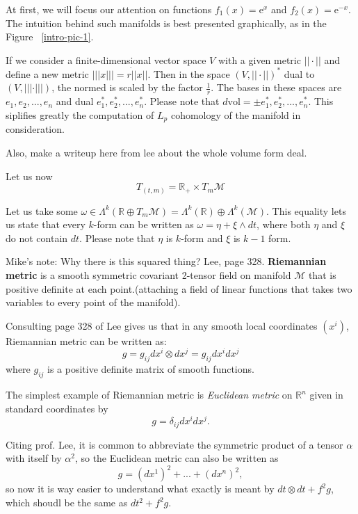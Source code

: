 \documentclass[licencjacka]{pracamgr}
\begin{document}

At first, we will focus our attention on functions $f_1(x) = \mathrm{e}^{x}$ and
$f_2(x) = \mathrm{e}^{-x}$. The intuition behind such manifolds is best presented
graphically, as in the Figure ~\ref{intro-pic-1}.

If we consider a finite-dimensional vector space $V$ with a given metric $||
\cdot ||$ and define a new metric $||| x |||  = r \dot || x ||$. Then in the
space $(V, || \cdot||)^\ast$ dual to $(V, ||| \cdot |||)$, the normed is scaled
by the factor $\frac{1}{r}$. The bases in these spaces are $e_1, e_2, ..., e_n$ and dual
$e_1^\ast, e_2^\ast, ..., e_n^\ast$. Please note that $d\mathrm{vol} = \pm
e_1^\ast, e_2^\ast, ..., e_n^\ast $. This siplifies greatly the computation of
$L_p$ cohomology of the manifold in consideration.

Also, make a writeup here from lee about the whole volume form deal.


Let us now
\[
    T_{(t, m)} = \mathbb{R}_+ \times T_m \mathcal{M}
\]

Let us take some $ \omega \in \Lambda^k(\mathbb{R} \oplus T_m \mathcal{M}) = 
\Lambda^k(\mathbb{R})  \oplus \Lambda^k(\mathcal{M}) $.
This equality lets us state that every $k$-form can be written as $\omega = \eta
+ \xi \wedge dt$, where both $\eta$ and $\xi$ do not contain $dt$.  Please note
that $\eta$ is $k$-form and $\xi$ is $k-1$ form. \\

\scriptsize

    Mike's note: Why there is this squared thing?
    Lee, page 328.
    \textbf{Riemannian metric} is a smooth symmetric covariant 2-tensor field
    on manifold $\mathcal{M}$ that is positive definite at each point.(attaching
    a field of linear functions that takes two variables to every point of the
    manifold).

    Consulting page 328 of Lee gives us that in any smooth local coordinates
    $(x^i)$, Riemannian metric can be written as:
    \[
        g = g_{ij} dx^i \otimes dx^j = g_{ij} dx^i dx^j
    \]
    where $g_{ij}$ is a positive definite matrix of smooth functions. 

    The simplest example of Riemannian metric is \emph{Euclidean metric} on
    $\mathbb{R}^n$ given in standard coordinates by 
    \[
        g = \delta_{ij}dx^idx^j.
    \]

    Citing prof. Lee, it is common to abbreviate the symmetric product of a tensor
    $\alpha$ with itself by $\alpha^2$, so the Euclidean metric can also be written
    as 
    \[
        g = (dx^1)^2 + ...  + (dx^n)^2,
    \]
    so now it is way easier to understand what exactly is meant by
    $ dt \otimes dt + f^2g $, which shoudl be the same as $dt^2 + f^2g$. \\
\end{document}
